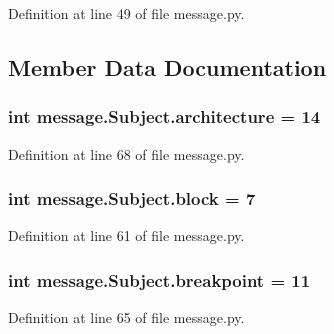 Definition at line 49 of file message.\+py.



\subsection{Member Data Documentation}
\hypertarget{classmessage_1_1Subject_a35928e11a365c303fb9f04d6aa028189}{}
\subsubsection[{architecture}]{\setlength{\rightskip}{0pt plus 5cm}int message.\+Subject.\+architecture = 14\hspace{0.3cm}{\ttfamily [static]}}\label{classmessage_1_1Subject_a35928e11a365c303fb9f04d6aa028189}


Definition at line 68 of file message.\+py.

\hypertarget{classmessage_1_1Subject_a157cafe1e7a72efff6dfd0bcaabcdd07}{}
\subsubsection[{block}]{\setlength{\rightskip}{0pt plus 5cm}int message.\+Subject.\+block = 7\hspace{0.3cm}{\ttfamily [static]}}\label{classmessage_1_1Subject_a157cafe1e7a72efff6dfd0bcaabcdd07}


Definition at line 61 of file message.\+py.

\hypertarget{classmessage_1_1Subject_a543f47987131625bd78e9eae567fe6c3}{}
\subsubsection[{breakpoint}]{\setlength{\rightskip}{0pt plus 5cm}int message.\+Subject.\+breakpoint = 11\hspace{0.3cm}{\ttfamily [static]}}\label{classmessage_1_1Subject_a543f47987131625bd78e9eae567fe6c3}


Definition at line 65 of file message.\+py.

\hypertarget{classmessage_1_1Subject_a3454782f27adb0f5a3a9cb2862b089b8}{}

